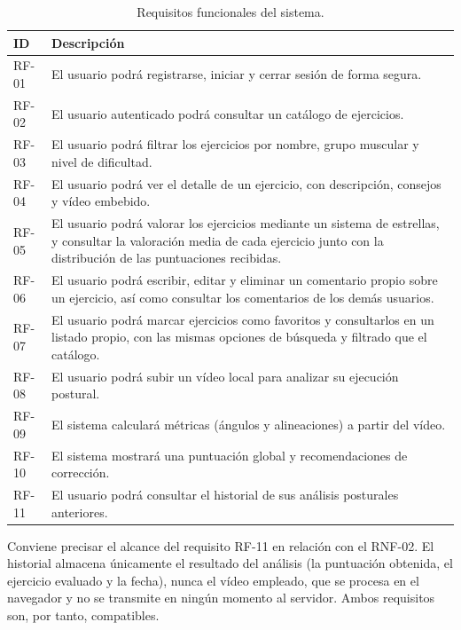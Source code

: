 \documentclass[12pt,a4paper,twoside,openright]{book}
\begin{document}
    \begin{table}[htbp]
        \centering
        \begin{tabular}{l p{10cm}}
            \toprule
            \textbf{ID} & \textbf{Descripción} \\
            \midrule
            RF-01 & El usuario podrá registrarse, iniciar y cerrar sesión de forma segura. \\
            RF-02 & El usuario autenticado podrá consultar un catálogo de ejercicios. \\
            RF-03 & El usuario podrá filtrar los ejercicios por nombre, grupo muscular y nivel de dificultad. \\
            RF-04 & El usuario podrá ver el detalle de un ejercicio, con descripción, consejos y vídeo embebido. \\
            RF-05 & El usuario podrá valorar los ejercicios mediante un sistema de estrellas, y consultar la valoración media de cada ejercicio junto con la distribución de las puntuaciones recibidas. \\
            RF-06 & El usuario podrá escribir, editar y eliminar un comentario propio sobre un ejercicio, así como consultar los comentarios de los demás usuarios. \\
            RF-07 & El usuario podrá marcar ejercicios como favoritos y consultarlos en un listado propio, con las mismas opciones de búsqueda y filtrado que el catálogo. \\
            RF-08 & El usuario podrá subir un vídeo local para analizar su ejecución postural. \\
            RF-09 & El sistema calculará métricas (ángulos y alineaciones) a partir del vídeo. \\
            RF-10 & El sistema mostrará una puntuación global y recomendaciones de corrección. \\
            RF-11 & El usuario podrá consultar el historial de sus análisis posturales anteriores. \\
            \bottomrule
        \end{tabular}
        \caption{Requisitos funcionales del sistema.}
        \label{tab:req-funcionales}
    \end{table}

    Conviene precisar el alcance del requisito RF-11 en relación con el
    RNF-02. El historial almacena únicamente el resultado del análisis
    (la puntuación obtenida, el ejercicio evaluado y la fecha),
    nunca el vídeo empleado, que se procesa en el navegador y no se transmite en ningún
    momento al servidor. Ambos requisitos son, por tanto, compatibles.
    
\end{document}
